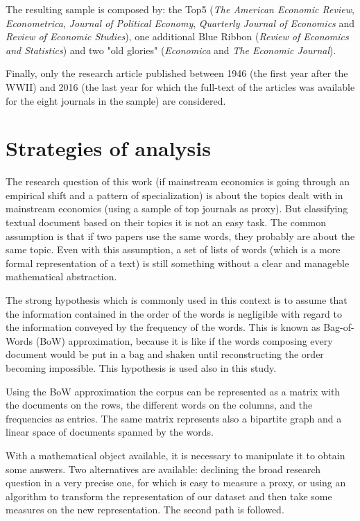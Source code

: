 \documentclass[a4paper, 11pt, headings=standardclasses, tablecaptionsbelow]{scrartcl}
\begin{document}
The resulting sample is composed by: the Top5 (\textit{The American Economic Review}, \textit{Econometrica}, \textit{Journal of Political Economy}, \textit{Quarterly Journal of Economics} and \textit{Review of Economic Studies}), one additional Blue Ribbon (\textit{Review of Economics and Statistics}) and two "old glories" (\textit{Economica} and \textit{The Economic Journal}).

Finally, only the research article published between 1946 (the first year after the WWII) and 2016 (the last year for which the full-text of the articles was available for the eight journals in the sample) are considered.

\section{Strategies of analysis}
The research question of this work (if mainstream economics is going through an empirical shift and a pattern of specialization) is about the topics dealt with in mainstream economics (using a sample of top journals as proxy).
But classifying textual document based on their topics it is not an easy task. The common assumption is that if two papers use the same words, they probably are about the same topic. Even with this assumption, a set of lists of words (which is a more formal representation of a text) is still something without a clear and manageble mathematical abstraction.

The strong hypothesis which is commonly used in this context is to assume that the information contained in the order of the words is negligible with regard to the information conveyed by the frequency of the words. This is known as Bag-of-Words (BoW) approximation, because it is like if the words composing every document would be put in a bag and shaken until reconstructing the order becoming impossible. This hypothesis is used also in this study.

Using the BoW approximation the corpus can be represented as a matrix with the documents on the rows, the different words on the columns, and the frequencies as entries. The same matrix represents also a bipartite graph and a linear space of documents spanned by the words.

With a mathematical object available, it is necessary to manipulate it to obtain some answers. Two alternatives are available: declining the broad research question in a very precise one, for which is easy to measure a proxy, or using an algorithm to transform the representation of our dataset and then take some measures on the new representation. The second path is followed.
\end{document}
